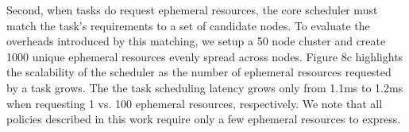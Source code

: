        
Second, when tasks do request ephemeral resources, the core scheduler must match the task's requirements to a set of candidate nodes.
To evaluate the overheads introduced by this matching, we setup a 50 node \ray{} cluster and create 1000 unique ephemeral resources evenly spread across nodes.
Figure 8c highlights the scalability of the scheduler as the number of ephemeral resources requested by a task grows. The the task scheduling latency grows only from 1.1ms to 1.2ms when requesting 1 vs. 100 ephemeral resources, respectively. We note that all policies described in this work require only a few ephemeral resources to express.
    



